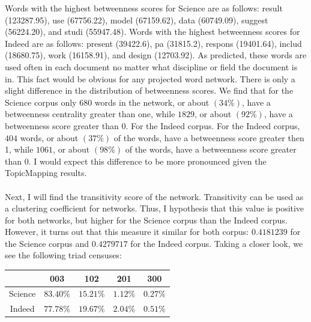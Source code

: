 \documentclass[12pt]{article}
\begin{document}
\noindent Words with the highest betweenness scores for Science are as follows:  result (123287.95), use (67756.22), model (67159.62), data (60749.09), suggest (56224.20), and studi (55947.48). Words with the highest betweenness scores for Indeed are as follows:  present (39422.6), pa (31815.2), respons (19401.64), includ (18680.75), work (16158.91), and design (12703.92). As predicted, these words are used often in each document no matter what discipline or field the document is in. This fact would be obvious for any projected word network. There is only a slight difference in the distribution of betweenness scores. We find that for the Science corpus only $680$ words in the network, or about $(34\%)$, have a betweenness centrality greater than one, while $1829$, or about $(92\%)$, have a betweenness score greater than $0$. For the Indeed corpus. For the Indeed corpus, $404$ words, or about $(37\%)$ of the words, have a betweenness score greater then 1, while $1061$, or about $(98\%)$ of the words, have a betweenness score greater than 0. I would expect this difference to be more pronounced given the TopicMapping results. 
\\
\\
Next, I will find the transitivity score of the network. Transitivity can be used as a clustering coefficient for networks. Thus, I hypothesis that this value is positive for both networks, but higher for the Science corpus than the Indeed corpus. However, it turns out that this measure it similar for both corpus:  $0.4181239$ for the Science corpus and $0.4279717$ for the Indeed corpus. Taking a closer look, we see the following triad censuses:
\vspace{2mm}
\begin{center}
	\begin{tabular}{ |c||c|c|c|c|  }
		\hline
		&003&102&201&300 \\ 
		\hline 
		Science& $83.40\%$ & $15.21\%$ & $1.12\%$ & $0.27\%$ \\
		Indeed& $77.78\%$ & $19.67\%$ & $2.04\%$ & $0.51\%$ \\
		\hline
	\end{tabular}
\end{center}
\vspace{2mm}
\end{document}
